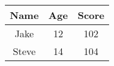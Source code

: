 \begin{tabular}{ccc}

	Name & Age & Score \\ \hline
	Jake & 12 & 102 \\
	Steve & 14 & 104 \\ \hline

\end{tabular}